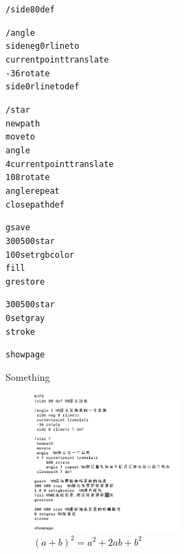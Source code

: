\documentclass[main.tex]{subfiles}
\begin{document}
\begin{alltt}
/side 80 def %

/angle { %
	side neg 0 rlineto
	currentpoint translate
	-36 rotate
	side 0 rlineto } def

/star {
	newpath
	moveto
	angle  %
	4 { currentpoint translate
		108 rotate
		angle } repeat %
	closepath } def

gsave  %
300 500 star  %
1 0 0 setrgbcolor  %
fill %
grestore

300 500 star %
0 setgray %
stroke

showpage
\end{alltt}

Something
\begin{figure}[h]
	\centering
	\includegraphics[width=0.5\textwidth]{images/star_code.png}
	\caption{$(a+b)^2 = a^2 + 2ab + b^2$}
	\label{fig:III.1.3}
\end{figure}
\end{document}

